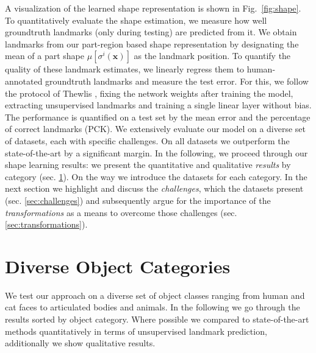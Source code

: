 	A visualization of the learned shape representation is shown in Fig.~\ref{fig:shape}. 
	To quantitatively evaluate the shape estimation, we measure how well groundtruth landmarks (only during testing) are predicted from it.
	We obtain landmarks from our part-region based shape representation by designating the mean of a part shape $\mu[\sigma^i(\mathbf{x})]$ as the landmark position. To quantify the quality of these landmark estimates, we linearly regress them to human-annotated groundtruth landmarks and measure the test error.
	For this, we follow the protocol of Thewlis \etal \cite{thewlis17}, fixing the network weights after training the model, extracting unsupervised landmarks and training a single linear layer without bias.
	The performance is quantified on a test set by the mean error and the percentage of correct landmarks (PCK).
	We extensively evaluate our model on a diverse set of datasets, each with specific challenges.
	On all datasets we outperform the state-of-the-art by a significant margin.
	In the following, we proceed through our shape learning results: we present the quantitative and qualitative \textit{results} by category (sec. \ref{sec:results}). On the way we introduce the datasets for each category. In the next section we highlight and discuss the \textit{challenges}, which the datasets present (sec. \ref{sec:challenges}) and subsequently argue for the importance of the \textit{transformations} as a means to overcome those challenges (sec. \ref{sec:transformations}).

\section{Diverse Object Categories}\label{sec:results}
	We test our approach on a diverse set of object classes ranging from human and cat faces to articulated bodies and animals. In the following we go through the results sorted by object category. Where possible we compared to state-of-the-art methods quantitatively in terms of unsupervised landmark prediction, additionally we show qualitative results.

